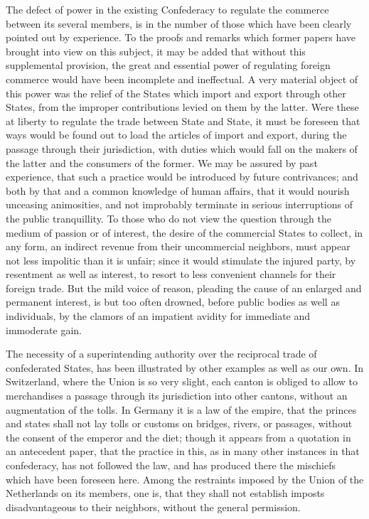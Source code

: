 The defect of power in the existing Confederacy to regulate the commerce between its several members, is in the number of those which have been clearly pointed out by experience. To the proofs and remarks which former papers have brought into view on this subject, it may be added that without this supplemental provision, the great and essential power of regulating foreign commerce would have been incomplete and ineffectual. A very material object of this power was the relief of the States which import and export through other States, from the improper contributions levied on them by the latter. Were these at liberty to regulate the trade between State and State, it must be foreseen that ways would be found out to load the articles of import and export, during the passage through their jurisdiction, with duties which would fall on the makers of the latter and the consumers of the former. We may be assured by past experience, that such a practice would be introduced by future contrivances; and both by that and a common knowledge of human affairs, that it would nourish unceasing animosities, and not improbably terminate in serious interruptions of the public tranquillity. To those who do not view the question through the medium of passion or of interest, the desire of the commercial States to collect, in any form, an indirect revenue from their uncommercial neighbors, must appear not less impolitic than it is unfair; since it would stimulate the injured party, by resentment as well as interest, to resort to less convenient channels for their foreign trade. But the mild voice of reason, pleading the cause of an enlarged and permanent interest, is but too often drowned, before public bodies as well as individuals, by the clamors of an impatient avidity for immediate and immoderate gain.

The necessity of a superintending authority over the reciprocal trade of confederated States, has been illustrated by other examples as well as our own. In Switzerland, where the Union is so very slight, each canton is obliged to allow to merchandises a passage through its jurisdiction into other cantons, without an augmentation of the tolls. In Germany it is a law of the empire, that the princes and states shall not lay tolls or customs on bridges, rivers, or passages, without the consent of the emperor and the diet; though it appears from a quotation in an antecedent paper, that the practice in this, as in many other instances in that confederacy, has not followed the law, and has produced there the mischiefs which have been foreseen here. Among the restraints imposed by the Union of the Netherlands on its members, one is, that they shall not establish imposts disadvantageous to their neighbors, without the general permission.

